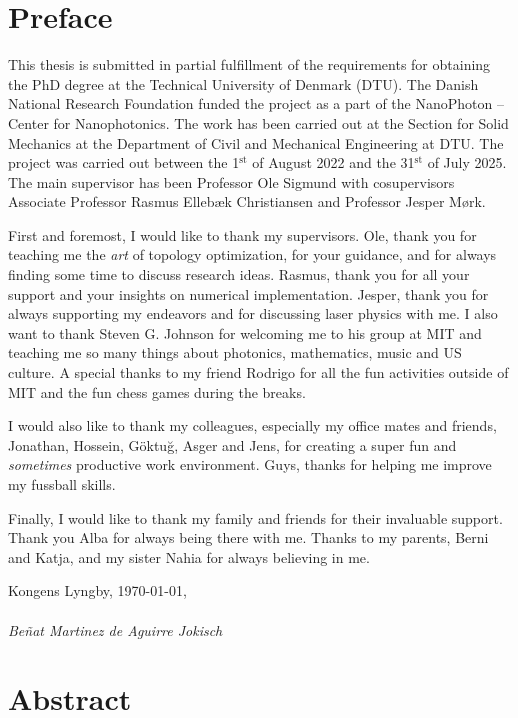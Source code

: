 \chapter*{Preface}
This thesis is submitted in partial fulfillment of the requirements for obtaining
the PhD degree at the Technical University of Denmark
(DTU). The Danish National Research Foundation funded the project as a part of
the NanoPhoton -- Center for Nanophotonics. The work has been carried out at the
Section for Solid Mechanics at the Department of Civil and Mechanical Engineering
at DTU. The project was carried out between the 1$^\text{st}$ of August 2022 and the 31$^\text{st}$
of July 2025. The main supervisor has been Professor Ole Sigmund with cosupervisors Associate Professor Rasmus Ellebæk Christiansen and Professor Jesper
Mørk.

First and foremost, I would like to thank my supervisors. Ole, thank you for teaching me the \emph{art} of topology optimization, for your guidance, and for always
finding some time to discuss research ideas. Rasmus, thank you for all your support and your insights on numerical implementation.
Jesper, thank you for always supporting my endeavors and for discussing 
laser physics with me. I also want to thank Steven G. Johnson for welcoming me to his group at MIT and teaching me so many things about photonics,
mathematics, music and US culture. A special thanks to my friend Rodrigo for all the fun activities outside of MIT and the fun chess games 
during the breaks.

I would also like to thank my colleagues, especially my office mates and friends, Jonathan, Hossein, Göktuğ, Asger and Jens, for creating 
a super fun and \emph{sometimes} productive work environment. Guys, thanks for helping me improve my fussball skills.


Finally, I would like to thank my family and friends for their invaluable support. Thank you Alba for always being there with me.
Thanks to my parents, Berni and Katja, and my sister Nahia for always believing in me.

\noindent Kongens Lyngby, \today,\\
\vspace{0.1cm}\\
\noindent \textit{Beñat Martinez de Aguirre Jokisch}

\chapter*{Abstract}

